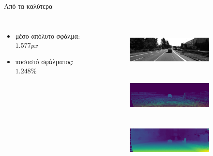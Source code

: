 \documentclass[english,greek]{beamer}
\begin{document}
\begin{frame}{Από τα καλύτερα}
\begin{columns}[onlytextwidth]
\begin{itemize}
	\item μέσο απόλυτο σφάλμα: $1.577 px$
	\item ποσοστό σφάλματος: $1.248\%$
\end{itemize}
\begin{figure}
	\centering
	\begin{subfigure}{\textwidth}
	\centering
	\includegraphics[height=20mm]{kitti2015_best_imL.png}
	\end{subfigure}
	
	\begin{subfigure}{\textwidth}
	\centering
	\includegraphics[height=20mm]{kitti2015_best_disparity_gt.png}
	\end{subfigure}
	
	\begin{subfigure}{\textwidth}
	\centering
	\includegraphics[height=20mm]{kitti2015_best_disparity_pred.png}
	\end{subfigure}
\end{figure}
\end{columns}
\end{frame}
\end{document}

